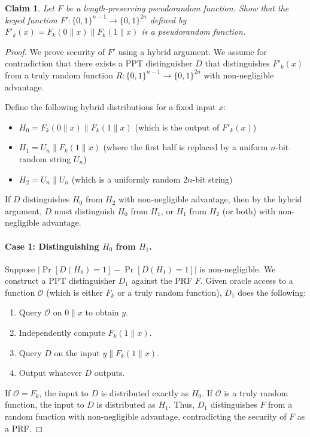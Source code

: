 \documentclass{article}
\newtheorem{claim}{Claim}
\begin{document}
\begin{claim}
Let $F$ be a length-preserving pseudorandom function. Show that the keyed function $F': \{0, 1\}^{n-1} \to \{0, 1\}^{2n}$ defined by $F'_k(x) = F_k(0 \parallel x) \parallel F_k(1 \parallel x)$ is a pseudorandom function.
\end{claim}
\begin{proof}
We prove security of $F'$ using a hybrid argument. We assume for contradiction that there exists a PPT distinguisher $D$ that distinguishes $F'_k(x)$ from a truly random function $R: \{0, 1\}^{n-1} \to \{0, 1\}^{2n}$ with non-negligible advantage.

Define the following hybrid distributions for a fixed input $x$:
\begin{itemize}
    \item $H_0 = F_k(0 \parallel x) \parallel F_k(1 \parallel x)$ (which is the output of $F'_k(x)$)
    \item $H_1 = U_n \parallel F_k(1 \parallel x)$ (where the first half is replaced by a uniform $n$-bit random string $U_n$)
    \item $H_2 = U_n \parallel U_n$ (which is a uniformly random $2n$-bit string)
\end{itemize}

If $D$ distinguishes $H_0$ from $H_2$ with non-negligible advantage, then by the hybrid argument, $D$ must distinguish $H_0$ from $H_1$, or $H_1$ from $H_2$ (or both) with non-negligible advantage.

\paragraph{Case 1: Distinguishing $H_0$ from $H_1$.}
Suppose $| \Pr[D(H_0) = 1] - \Pr[D(H_1) = 1] |$ is non-negligible. We construct a PPT distinguisher $D_1$ against the PRF $F$. Given oracle access to a function $\mathcal{O}$ (which is either $F_k$ or a truly random function), $D_1$ does the following:
\begin{enumerate}
    \item Query $\mathcal{O}$ on $0 \parallel x$ to obtain $y$.
    \item Independently compute $F_k(1 \parallel x)$.
    \item Query $D$ on the input $y \parallel F_k(1 \parallel x)$.
    \item Output whatever $D$ outputs.
\end{enumerate}
If $\mathcal{O} = F_k$, the input to $D$ is distributed exactly as $H_0$. If $\mathcal{O}$ is a truly random function, the input to $D$ is distributed as $H_1$. Thus, $D_1$ distinguishes $F$ from a random function with non-negligible advantage, contradicting the security of $F$ as a PRF.


\end{proof}
\end{document}
